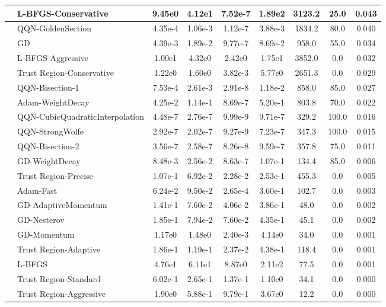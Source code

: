 \documentclass{article}
\begin{document}
\begin{longtable}{|l|l|c|c|c|c|c|c|c|}
\hline
 & L-BFGS-Conservative & 9.45e0 & 4.12e1 & 7.52e-7 & 1.89e2 & 3123.2 & 25.0 & 0.043 \\
\hline
 & QQN-GoldenSection & 4.35e-4 & 1.06e-3 & 1.12e-7 & 3.88e-3 & 1834.2 & 80.0 & 0.040 \\
\hline
 & GD & 4.39e-3 & 1.89e-2 & 9.77e-7 & 8.69e-2 & 958.0 & 55.0 & 0.034 \\
\hline
 & L-BFGS-Aggressive & 1.00e1 & 4.32e0 & 2.42e0 & 1.75e1 & 3852.0 & 0.0 & 0.032 \\
\hline
 & Trust Region-Conservative & 1.22e0 & 1.60e0 & 3.82e-3 & 5.77e0 & 2651.3 & 0.0 & 0.029 \\
\hline
 & QQN-Bisection-1 & 7.53e-4 & 2.61e-3 & 2.91e-8 & 1.18e-2 & 858.0 & 85.0 & 0.027 \\
\hline
 & Adam-WeightDecay & 4.25e-2 & 1.14e-1 & 8.69e-7 & 5.20e-1 & 803.8 & 70.0 & 0.022 \\
\hline
 & QQN-CubicQuadraticInterpolation & 4.48e-7 & 2.76e-7 & 9.99e-9 & 9.71e-7 & 329.2 & 100.0 & 0.016 \\
\hline
 & QQN-StrongWolfe & 2.92e-7 & 2.02e-7 & 9.27e-9 & 7.23e-7 & 347.3 & 100.0 & 0.015 \\
\hline
 & QQN-Bisection-2 & 3.56e-7 & 2.58e-7 & 8.26e-8 & 9.59e-7 & 357.8 & 75.0 & 0.011 \\
\hline
 & GD-WeightDecay & 8.48e-3 & 2.56e-2 & 8.63e-7 & 1.07e-1 & 134.4 & 85.0 & 0.006 \\
\hline
 & Trust Region-Precise & 1.07e-1 & 6.92e-2 & 2.28e-2 & 2.53e-1 & 455.3 & 0.0 & 0.005 \\
\hline
 & Adam-Fast & 6.24e-2 & 9.50e-2 & 2.65e-4 & 3.60e-1 & 102.7 & 0.0 & 0.003 \\
\hline
 & GD-AdaptiveMomentum & 1.41e-1 & 7.60e-2 & 4.06e-2 & 3.86e-1 & 48.0 & 0.0 & 0.002 \\
\hline
 & GD-Nesterov & 1.85e-1 & 7.94e-2 & 7.60e-2 & 4.35e-1 & 45.1 & 0.0 & 0.002 \\
\hline
 & GD-Momentum & 1.17e0 & 1.48e0 & 2.40e-3 & 4.14e0 & 34.0 & 0.0 & 0.001 \\
\hline
 & Trust Region-Adaptive & 1.86e-1 & 1.19e-1 & 2.37e-2 & 4.38e-1 & 118.4 & 0.0 & 0.001 \\
\hline
 & L-BFGS & 4.76e1 & 6.11e1 & 8.87e0 & 2.11e2 & 77.5 & 0.0 & 0.001 \\
\hline
 & Trust Region-Standard & 6.02e-1 & 2.65e-1 & 1.37e-1 & 1.10e0 & 34.1 & 0.0 & 0.000 \\
\hline
 & Trust Region-Aggressive & 1.90e0 & 5.88e-1 & 9.79e-1 & 3.67e0 & 12.2 & 0.0 & 0.000 \\

\end{longtable}
\end{document}
